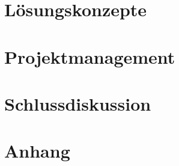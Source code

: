 \documentclass[11pt]{scrartcl}
\begin{document}
        \section{Lösungskonzepte}
        
        \clearpage
        \section{Projektmanagement}
        
        \clearpage
        \section{Schlussdiskussion}
        
        \clearpage
        \section{Anhang}
        

    
\end{document}
